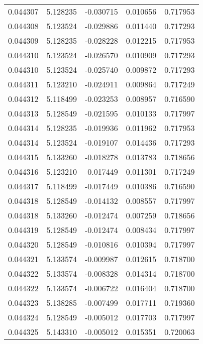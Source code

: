 \begin{tabular}{lrrrr}
0.044307    &  5.128235 & -0.030715 &  0.010656 &             0.717953 \\
0.044308    &  5.123524 & -0.029886 &  0.011440 &             0.717293 \\
0.044309    &  5.128235 & -0.028228 &  0.012215 &             0.717953 \\
0.044310    &  5.123524 & -0.026570 &  0.010909 &             0.717293 \\
0.044310    &  5.123524 & -0.025740 &  0.009872 &             0.717293 \\
0.044311    &  5.123210 & -0.024911 &  0.009864 &             0.717249 \\
0.044312    &  5.118499 & -0.023253 &  0.008957 &             0.716590 \\
0.044313    &  5.128549 & -0.021595 &  0.010133 &             0.717997 \\
0.044314    &  5.128235 & -0.019936 &  0.011962 &             0.717953 \\
0.044314    &  5.123524 & -0.019107 &  0.014436 &             0.717293 \\
0.044315    &  5.133260 & -0.018278 &  0.013783 &             0.718656 \\
0.044316    &  5.123210 & -0.017449 &  0.011301 &             0.717249 \\
0.044317    &  5.118499 & -0.017449 &  0.010386 &             0.716590 \\
0.044318    &  5.128549 & -0.014132 &  0.008557 &             0.717997 \\
0.044318    &  5.133260 & -0.012474 &  0.007259 &             0.718656 \\
0.044319    &  5.128549 & -0.012474 &  0.008434 &             0.717997 \\
0.044320    &  5.128549 & -0.010816 &  0.010394 &             0.717997 \\
0.044321    &  5.133574 & -0.009987 &  0.012615 &             0.718700 \\
0.044322    &  5.133574 & -0.008328 &  0.014314 &             0.718700 \\
0.044322    &  5.133574 & -0.006722 &  0.016404 &             0.718700 \\
0.044323    &  5.138285 & -0.007499 &  0.017711 &             0.719360 \\
0.044324    &  5.128549 & -0.005012 &  0.017703 &             0.717997 \\
0.044325    &  5.143310 & -0.005012 &  0.015351 &             0.720063 \\

\end{tabular}
